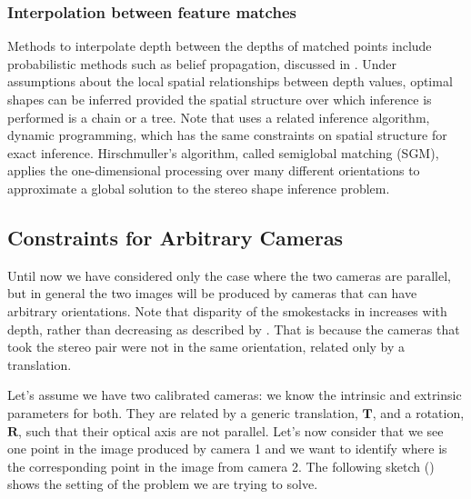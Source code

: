 \subsubsection{Interpolation between feature matches}
Methods to interpolate depth between the depths of matched points include probabilistic methods such as belief propagation, discussed in
\chap{\ref{chapter:probabilistic_graphical_models}}.
Under assumptions about the local spatial relationships between depth values, optimal shapes can be inferred provided the spatial structure over which inference is performed is a chain or a tree.  Note that \cite{Hirschmuller2007} uses a related inference algorithm, dynamic programming, which has the same constraints on spatial structure for exact inference.  Hirschmuller's algorithm, called semiglobal matching (SGM), applies the one-dimensional processing over many different orientations to approximate a global solution to the stereo shape inference problem.


\subsection{Constraints for Arbitrary Cameras}

Until now we have considered only the case where the two cameras are parallel, but in general the two images will be produced by cameras that can have arbitrary orientations. Note that disparity of the smokestacks in  increases with depth, rather than decreasing as described by \eqn{\ref{eq:depthFromDisparity}}.  That is because the cameras that took the stereo pair were not in the same orientation, related only by a translation.






Let's assume we have two calibrated cameras: we know the intrinsic and extrinsic parameters for both. They are related by a generic translation, $\mathbf{T}$, and a rotation, $\mathbf{R}$, such that their optical axis are not parallel. Let's now consider that we see one point in the image produced by camera 1 and we want to identify where is the corresponding point in the image from camera 2. The following sketch (\fig{\ref{fig:epipolar_1}}) shows the setting of the problem we are trying to solve.


